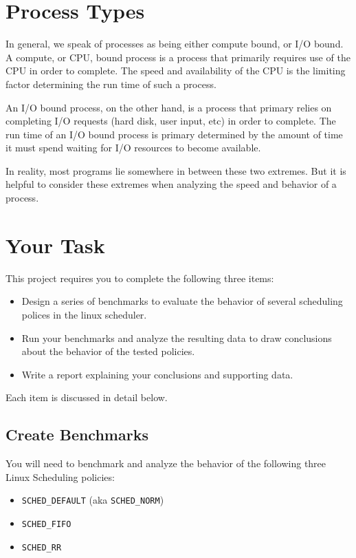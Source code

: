 \documentclass[12pt]{article}
\begin{document}
\section{Process Types}

In general, we speak of processes as being either compute bound, or
I/O bound. A compute, or CPU, bound process is a process that primarily
requires use of the CPU in order to complete. The speed and availability
of the CPU is the limiting
factor determining the run time of such a process.

An I/O bound process, on the other hand, is a process that
primary relies on completing I/O requests (hard disk, user input, etc)
in order to complete. The run time of an I/O bound process is primary
determined by the amount of time it must spend waiting for I/O
resources to become available.

In reality, most programs lie somewhere in between these two
extremes. But it is helpful to consider these extremes when analyzing
the speed and behavior of a process.

\section{Your Task}

This project requires you to complete the following three items:

\begin{itemize}
\item Design a series of benchmarks to evaluate the behavior of
  several scheduling polices in the linux scheduler.
\item Run your benchmarks and analyze the resulting data to draw
  conclusions about the behavior of the tested policies. 
\item Write a report explaining your conclusions and supporting data.
\end{itemize}

Each item is discussed in detail below.

\subsection{Create Benchmarks}

You will need to benchmark and analyze the behavior of the following
three Linux Scheduling policies:

\begin{itemize}
\item \texttt{SCHED\_DEFAULT} (aka \texttt{SCHED\_NORM})
\item \texttt{SCHED\_FIFO}
\item \texttt{SCHED\_RR}
\end{itemize}
\end{document}
